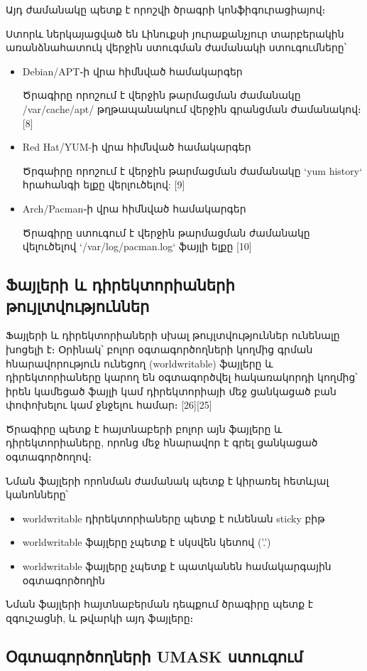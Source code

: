 \documentclass[10pt]{article}
\begin{document}
\begin{sloppypar}
Այդ ժամանակը պետք է որոշվի ծրագրի կոնֆիգուրացիայով։

Ստորև ներկայացված են Լինուքսի յուրաքանչյուր տարբերակին առանձնահատուկ
վերջին ստուգման ժամանակի ստուգումները՝

\begin{itemize}
\item{Debian/APT֊ի վրա հիմնված համակարգեր}

Ծրագիրը որոշում է վերջին թարմացման ժամանակը /var/cache/apt/
թղթապանակում վերջին գրանցման ժամանակով։ [8]

\item{Red Hat/YUM-ի վրա հիմնված համակարգեր}

Ծրգաիրը որոշում է վերջին թարմացման ժամանակը `yum history`
հրահանգի ելքը վերլուծելով: [9]

\item{Arch/Pacman֊ի վրա հիմնված համակարգեր}

Ծրագիրը ստուգում է վերջին թարմացման ժամանակը վելուծելով
`/var/log/pacman.log` ֆայլի ելքը [10]
\end{itemize}


\subsection{Ֆայլերի և դիրեկտորիաների թույլտվություններ}


Ֆայլերի և դիրեկտորիաների սխալ թույլտվություններ ունենալը
խոցելի է։ Օրինակ՝ բոլոր օգտագործողների կողմից գրման
հնարավորություն ունեցող (worldwritable) ֆայլերը և
դիրեկտորիաները կարող են օգտագործվել հակառակորդի կողմից՝
իրեն կամեցած ֆայլի կամ դիրեկտորիայի մեջ ցանկացած
բան փոփոխելու կամ ջնջելու համար։ [26][25]

Ծրագիրը պետք է հայտնաբերի բոլոր այն ֆայլերը և դիրեկտորիաները,
որոնց մեջ հնարավոր է գրել ցանկացած օգտագործողով։

Նման ֆայլերի որոնման ժամանակ պետք է կիրառել հետևյալ կանոնները՝

\begin{itemize}
\item worldwritable դիրեկտորիաները պետք է ունենան sticky բիթ
\item worldwritable ֆայլերը չպետք է սկսվեն կետով ('.')
\item worldwritable ֆայլերը չպետք է պատկանեն համակարգային օգտագործողին
\end{itemize}

Նման ֆայլերի հայտնաբերման դեպքում ծրագիրը պետք է զգուշացնի,
և թվարկի այդ ֆայլերը։


\subsection{Օգտագործողների UMASK ստուգում}



\end{sloppypar}
\end{document}
